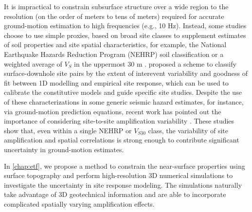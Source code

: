 It is impractical to constrain subsurface structure over a wide region to the resolution (on the order of meters to tens of meters) required for accurate ground-motion estimation to high frequencies (e.g., 10 Hz). Instead, some studies choose to use simple proxies, based on broad site classes to supplement estimates of soil properties and site spatial characteristics, for example, the National Earthquake Hazards Reduction Program (NEHRP) soil classification \citep{bssc2003NEHRPRecommended2003,akkarEmpiricalEquationsPrediction2010} or a weighted average of $V_S$ in the uppermost 30 m \citep[$V_{S30}$, e.g., ][]{abrahamsonSummaryAbrahamsonSilva2008,idrissNGAWest2EmpiricalModel2014}. \citet{thompsonTaxonomySiteResponse2012} proposed a scheme to classify surface-downhole site pairs by the extent of interevent variability and goodness of fit between 1D modelling and empirical site response, which can be used to calibrate the constitutive models and guide specific site studies. Despite the use of these characterizations in some generic seismic hazard estimates, for instance, via ground-motion prediction equations, recent work has pointed out the importance of considering site-to-site amplification variability \citep{atkinsonEarthquakeGroundmotionPrediction2006,atikVariabilityGroundmotionPrediction2010}. These studies show that, even within a single NEHRP or $V_{S30}$ class, the variability of site amplification and spatial correlations is strong enough to contribute significant uncertainty in ground-motion estimates.

In \cref{chap:etf}, we propose a method to constrain the near-surface properties using surface topography and perform high-resolution 3D numerical simulations to investigate the uncertainty in site response modeling. The simulations naturally take advantage of 3D geotechnical information and are able to incorporate complicated spatially varying amplification effects.


\renewcommand{\thetable}{\arabic{table}}
\renewcommand{\thefigure}{\arabic{figure}}

